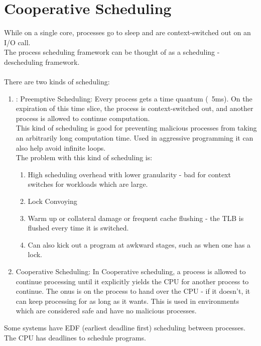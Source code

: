 \documentclass[twoside]{article}
\begin{document}
\section{Cooperative Scheduling}
While on a single core, processes go to sleep and are context-switched out on an I/O call. \\
The process scheduling framework can be thought of as a scheduling - descheduling framework. \\ \\ 
There are two kinds of scheduling: 
\begin{enumerate}
\item: Preemptive Scheduling: Every process gets a time quantum (~5ms). On the expiration of this time slice, the process is context-switched out, and another process is allowed to continue computation. \\
This kind of scheduling is good for preventing malicious processes from taking an arbitrarily long computation time. Used in aggressive programming it can also help avoid infinite loops.\\
The problem with this kind of scheduling is: 
\begin{enumerate}
\item High scheduling overhead with lower granularity - bad for context switches for workloads which are large.
\item Lock Convoying
\item Warm up or collateral damage or frequent cache flushing - the TLB is flushed every time it is switched.
\item Can also kick out a program at awkward stages, such as when one has a lock.
\end{enumerate} 
\item Cooperative Scheduling: In Cooperative scheduling, a process is allowed to continue processing until it explicitly yields the CPU for another process to continue. The onus is on the process to hand over the CPU - if it doesn't, it can keep processing for as long as it wants. This is used in environments which are considered safe and have no malicious processes.
\end{enumerate}
Some systems have EDF (earliest deadline first) scheduling between processes. The CPU has deadlines to schedule programs.
\end{document}
